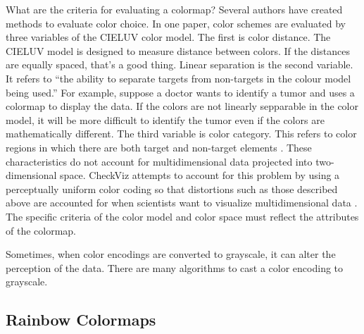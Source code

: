 \documentclass[journal]{IEEEtran}
\begin{document}
\par
What are the criteria for evaluating a colormap? Several authors have created methods to evaluate color
choice. In one paper, color schemes are evaluated by
three variables of the CIELUV color model. The first
is color distance. The CIELUV model is designed to
measure distance between colors. If the distances are
equally spaced, that’s a good thing. Linear separation
is the second variable. It refers to “the ability to separate targets from non-targets in the colour model being
used.” For example, suppose a doctor wants to identify
a tumor and uses a colormap to display the data. If the
colors are not linearly sepparable in the color model, it
will be more difficult to identify the tumor even if the
colors are mathematically different. The third variable
is color category. This refers to color regions in which
there are both target and non-target elements \cite{colorchoice}.
 These characteristics do not account for multidimensional data projected into two-dimensional
space. CheckViz attempts to account for this problem
by using a perceptually uniform color coding so that
distortions such as those described above are accounted for when 
scientists want to visualize multidimensional data \cite{checkviz}. The specific criteria of the color
model and color space must reflect the attributes of the colormap.
\par
Sometimes, when color encodings are converted to
grayscale, it can alter the perception of the data. There
are many algorithms to cast a color encoding to grayscale.

\subsection{Rainbow Colormaps}
\end{document}
